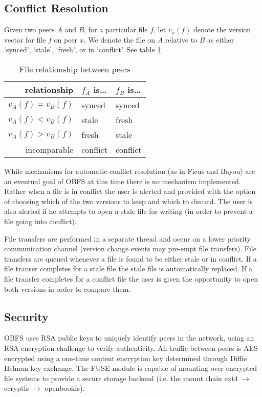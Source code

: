 \documentclass[10pt,twocolumn]{article}
\begin{document}
\subsection{Conflict Resolution}
Given two peers $A$ and $B$, for a particular file $f$, let $v_x(f)$ denote the
version vector for file $f$ on peer $x$. We denote the file on $A$ relative to
$B$ as either `synced', `stale', `fresh', or in `conflict'. See table \ref{tbl:FileRelationship}

\begin{table}
    \centering
    \begin{tabular}{r|l|l}
        relationship        &  $f_A$ is\ldots & $f_B$ is\ldots \\ \hline
        $v_A(f) = v_B(f)$   &  synced         & synced         \\
        $v_A(f) < v_B(f)$   &  stale          & fresh          \\
        $v_A(f) > v_B(f)$   &  fresh          & stale          \\
        incomparable        &  conflict       & conflict       
    \end{tabular}
    \caption{File relationship between peers}
	\label{tbl:FileRelationship}
\end{table}

While mechanisms for automatic conflict resolution (as in Ficus and Bayou) are
an eventual goal of OBFS at this time there is no mechanism implemented. Rather
when a file is in conflict the user is alerted and provided with the option of
choosing which of the two versions to keep and which to discard. The user is
also alerted if he attempts to open a stale file for writing (in order to 
prevent a file going into conflict). 

File transfers are performed in a separate thread and occur on a lower 
priority communication channel (version change events may pre-empt file
transfers). File transfers are queued whenever a file is found to be either
stale or in conflict. If a file transer completes for a stale file the stale
file is automatically replaced. If a file transfer completes for a conflict 
file the user is given the opportunity to open both versions in order to compare 
them. 

\subsection{Security}

OBFS uses RSA public keys to uniquely identify peers in the network, using an
RSA encryption challenge to verify authenticity. All traffic between peers is
AES encrypted using a one-time content encryption key determined through Diffie
Helman key exchange. The FUSE module is capable of mounting over encrypted file
systems to provide a secure storage backend (i.e. the mount chain ext4 
$\rightarrow$ ecryptfs $\rightarrow$ openbookfs).
\end{document}
